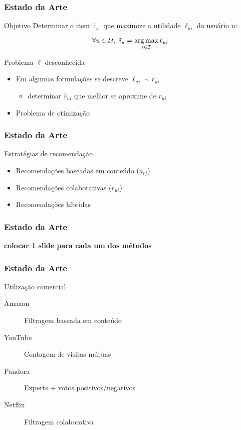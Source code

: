 \begin{frame}
\frametitle{Estado da Arte}
\begin{block}{Objetivo}
Determinar o item $\tilde{\imath}_u$ que maximize a utilidade $\ell_{ui}$ do usuário $u$:
\end{block}

$$
\forall u \in \mathcal{U}, ~ \tilde{\imath}_u = \operatorname*{arg\,max}_{i \in \mathcal{I}}{\ell_{ui}}
$$


\begin{alertblock}{Problema}
$\ell$ desconhecida
\end{alertblock}

\begin{itemize}
	\item Em algumas formulações se descreve $\ell_{ui} \sim r_{ui}$
	\begin{itemize}
		\item determinar $\hat{r}_{ui}$ que melhor se aproxime de $r_{ui}$
	\end{itemize}
	\item Problema de otimização
\end{itemize}
\end{frame}



\begin{frame}
\frametitle{Estado da Arte}
\begin{block}{Estratégias de recomendação}
\begin{itemize}
	\item Recomendações baseadas em conteúdo ($a_{if}$)
	\item Recomendações colaborativas ($r_{ui}$)
	\item Recomendações híbridas
\end{itemize}
\end{block}

\end{frame}


\begin{frame}
\frametitle{Estado da Arte}
\textbf{colocar 1 slide para cada um dos métodos}
\end{frame}

\begin{frame}
\frametitle{Estado da Arte}

Utilização comercial \cite{chiang2012networked}

\begin{description}
\item[Amazon] Filtragem baseada em conteúdo
\item[YouTube] Contagem de visitas mútuas
\item[Pandora] Experts + votos positivos/negativos
\item[Netflix] Filtragem colaborativa
\end{description}
\end{frame}

